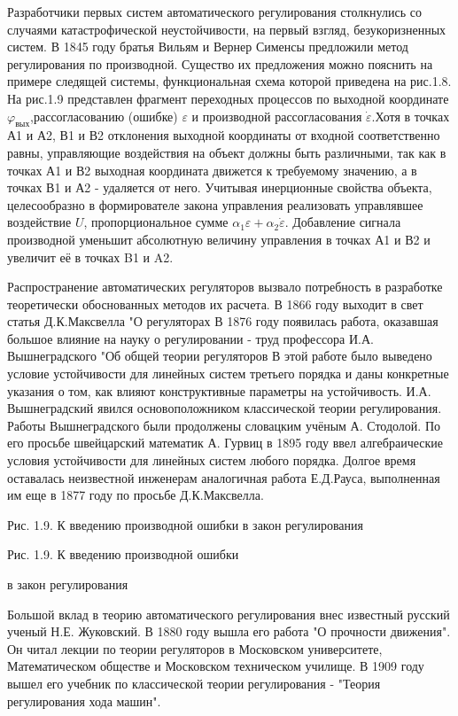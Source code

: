 Разработчики первых систем автоматического регулирования столкнулись со случаями катастрофической неустойчивости, 
на первый взгляд, безукоризненных систем. В 1845 году братья Вильям и Вернер Сименсы предложили метод регулирования 
по производной. Существо их предложения можно пояснить на примере следящей системы, функциональная схема которой
приведена на рис.1.8. На рис.1.9 представлен фрагмент переходных процессов по выходной координате $ \varphi_{вых} $,рассогласованию  (ошибке) $\varepsilon  $ и производной рассогласования $ \dot{\varepsilon} $.Хотя в точках А1 и А2, В1 и В2 отклонения выходной  координаты от входной соответственно равны, управляющие воздействия на объект должны быть различными, так как в точках А1 и В2 выходная координата движется к требуемому значению, а в точках В1 и А2 - удаляется от него. Учитывая инерционные свойства объекта, целесообразно в формирователе закона управления реализовать управлявшее воздействие $ U $, пропорциональное сумме $ \alpha_{1}\varepsilon+\alpha_{2}\dot{\varepsilon} $. Добавление сигнала производной уменьшит абсолютную величину управления в точках А1 и В2 и увеличит её в точках B1 и A2.

Распространение автоматических регуляторов вызвало потребность в разработке теоретически обоснованных методов их расчета. В 1866 году выходит в свет статья Д.К.Максвелла "О регуляторах В 1876 году появилась работа, оказавшая большое влияние на науку о регулировании - труд профессора И.А. Вышнеградского "Об общей теории регуляторов В этой работе было выведено условие устойчивости для линейных систем третьего порядка и даны конкретные указания о том, как влияют конструктивные параметры на устойчивость. И.А. Вышнеградский явился основоположником классической теории регулирования. Работы Вышнеградского были продолжены словацким учёным А. Стодолой. По его просьбе швейцарский математик А. Гурвиц в 1895 году ввел алгебраические условия устойчивости для линейных систем любого порядка. Долгое время оставалась неизвестной инженерам аналогичная работа Е.Д.Рауса, выполненная им еще в 1877 году по просьбе Д.К.Максвелла.

Рис. 1.9. К введению производной ошибки в закон регулирования



		Рис. 1.9. К введению производной ошибки



		в закон регулирования



\bigskip


		Большой вклад в теорию автоматического регулирования внес из­вестный русский ученый Н.Е. Жуковский. В 1880 году вышла
		его работа "О прочности движения". Он читал лекции по теории регуляторов в Московском университете, Математическом
		обществе и Московском тех­ническом училище. В 1909 году вышел его учебник по классической теории регулирования -
		"Теория регулирования хода машин".



